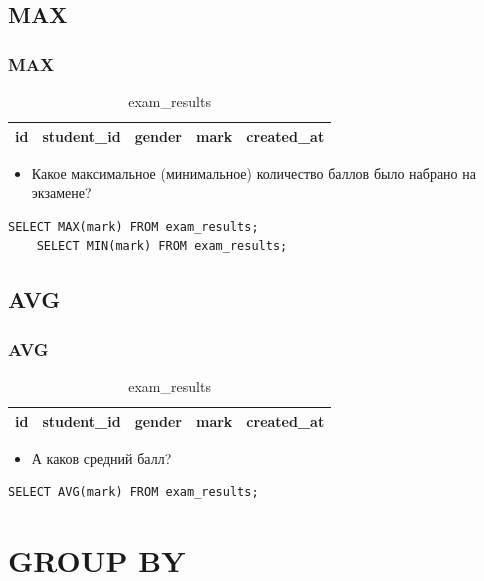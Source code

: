 \documentclass[compress,red]{beamer}
\begin{document}
\subsection{MAX}
\begin{frame}[fragile]
  \frametitle{MAX}
  \begin{table}
    \begin{tabular}{|c|c|c|c|c|}
      \hline
      id & student\_id & gender & mark & created\_at\\
      \hline
    \end{tabular}
    \caption{exam\_results}
  \end{table}
  \begin{itemize}
    \item Какое максимальное (минимальное) количество баллов было набрано на экзамене?
  \end{itemize}
  \scriptsize{
  \begin{lstlisting}[label=sql4,caption=SELECT MAX,MIN]
    SELECT MAX(mark) FROM exam_results;
    SELECT MIN(mark) FROM exam_results;
  \end{lstlisting}
  }
\end{frame}

\subsection{AVG}
\begin{frame}[fragile]
  \frametitle{AVG}
  \begin{table}
    \begin{tabular}{|c|c|c|c|c|}
      \hline
      id & student\_id & gender & mark & created\_at\\
      \hline
    \end{tabular}
    \caption{exam\_results}
  \end{table}
  \begin{itemize}
    \item А каков средний балл?
  \end{itemize}
  \scriptsize{
  \begin{lstlisting}[label=sql5,caption=SELECT AVG]
    SELECT AVG(mark) FROM exam_results;
  \end{lstlisting}
  }
\end{frame}

\section{GROUP BY}
\end{document}
